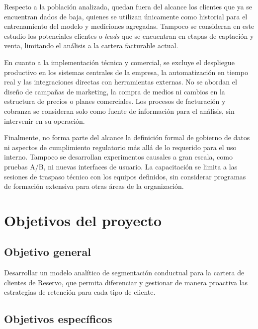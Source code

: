Respecto a la población analizada, quedan fuera del alcance los clientes que ya se encuentran dados de baja, quienes se utilizan únicamente como historial para el entrenamiento del modelo y mediciones agregadas. Tampoco se consideran en este estudio los potenciales clientes o \textit{leads} que se encuentran en etapas de captación y venta, limitando el análisis a la cartera facturable actual.

En cuanto a la implementación técnica y comercial, se excluye el despliegue productivo en los sistemas centrales de la empresa, la automatización en tiempo real y las integraciones directas con herramientas externas. No se abordan el diseño de campañas de marketing, la compra de medios ni cambios en la estructura de precios o planes comerciales. Los procesos de facturación y cobranza se consideran solo como fuente de información para el análisis, sin intervenir en su operación.

Finalmente, no forma parte del alcance la definición formal de gobierno de datos ni aspectos de cumplimiento regulatorio más allá de lo requerido para el uso interno. Tampoco se desarrollan experimentos causales a gran escala, como pruebas A/B, ni nuevas interfaces de usuario. La capacitación se limita a las sesiones de traspaso técnico con los equipos definidos, sin considerar programas de formación extensiva para otras áreas de la organización.

\newpage
\section{Objetivos del proyecto}

\subsection{Objetivo general}

Desarrollar un modelo analítico de segmentación conductual para la cartera de clientes de Reservo, que permita diferenciar y gestionar de manera proactiva las estrategias de retención para cada tipo de cliente.

\subsection{Objetivos específicos}

